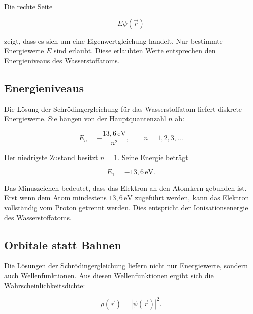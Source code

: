 Die rechte Seite

\begin{equation}
	E\psi(\vec r)
	\label{eq:app_energie_eigenwert_wasserstoff}
\end{equation}

zeigt, dass es sich um eine Eigenwertgleichung
handelt. Nur bestimmte Energiewerte \(E\) sind erlaubt. Diese erlaubten Werte
entsprechen den Energieniveaus des Wasserstoffatoms.

\subsection*{Energieniveaus}

Die Lösung der Schrödingergleichung für das Wasserstoffatom liefert diskrete
Energiewerte. Sie hängen von der Hauptquantenzahl
\(n\) ab:

\begin{equation}
	E_n
	=
	-\frac{13{,}6\,\mathrm{eV}}{n^2},
	\qquad
	n = 1,2,3,\dots
	\label{eq:app_energieniveaus_wasserstoff_ev}
\end{equation}

Der niedrigste Zustand besitzt \(n=1\). Seine Energie beträgt

\begin{equation}
	E_1 = -13{,}6\,\mathrm{eV}.
	\label{eq:app_grundzustand_wasserstoff}
\end{equation}

Das Minuszeichen bedeutet, dass das Elektron an den Atomkern gebunden ist. Erst
wenn dem Atom mindestens \(13{,}6\,\mathrm{eV}\) zugeführt werden, kann das
Elektron vollständig vom Proton getrennt werden. Dies entspricht der
Ionisationsenergie des Wasserstoffatoms.

\subsection*{Orbitale statt Bahnen}

Die Lösungen der Schrödingergleichung liefern nicht nur Energiewerte, sondern
auch Wellenfunktionen. Aus diesen Wellenfunktionen ergibt sich die
Wahrscheinlichkeitsdichte:

\begin{equation}
	\rho(\vec r)
	=
	|\psi(\vec r)|^2 .
	\label{eq:app_wahrscheinlichkeitsdichte_wasserstoff}
\end{equation}


